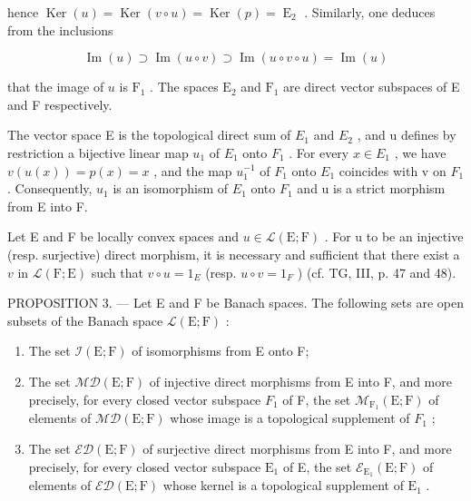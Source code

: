 hence \(\operatorname{Ker}(u) = \operatorname{Ker}(v \circ u) = \operatorname{Ker}(p) = \operatorname{E}_{2}\) . Similarly, one deduces from the inclusions

\[
\operatorname{Im} (u) \supset \operatorname{Im} (u \circ v) \supset \operatorname{Im} (u \circ v \circ u) = \operatorname{Im} (u)
\]

that the image of \(u\) is \(\mathrm{F}_{1}\) . The spaces \(\mathrm{E}_{2}\) and \(\mathrm{F}_{1}\) are direct vector subspaces of E and F respectively.

The vector space E is the topological direct sum of \(E_{1}\) and \(E_{2}\) , and u defines by restriction a bijective linear map \(u_{1}\) of \(E_{1}\) onto \(F_{1}\) . For every \(x \in E_{1}\) , we have \(v(u(x)) = p(x) = x\) , and the map \(u_{1}^{-1}\) of \(F_{1}\) onto \(E_{1}\) coincides with v on \(F_{1}\) . Consequently, \(u_{1}\) is an isomorphism of \(E_{1}\) onto \(F_{1}\) and u is a strict morphism from E into F.

Let E and F be locally convex spaces and \(u \in \mathcal{L}(\mathrm{E};\mathrm{F})\) . For u to be an injective (resp. surjective) direct morphism, it is necessary and sufficient that there exist a \(v\) in \(\mathcal{L}(\mathrm{F};\mathrm{E})\) such that \(v \circ u = 1_{E}\) (resp. \(u \circ v = 1_{F}\) ) (cf. TG, III, p. 47 and 48).

PROPOSITION 3. --- Let E and F be Banach spaces. The following sets are open subsets of the Banach space \(\mathcal{L}(\mathrm{E};\mathrm{F})\) :

\begin{enumerate}
\def\labelenumi{\alph{enumi})}
\item
  The set \(\mathcal{I}(\mathrm{E};\mathrm{F})\) of isomorphisms from E onto F;
\item
   The set \(\mathcal{M}\mathcal{D}(\mathrm{E};\mathrm{F})\) of injective direct morphisms from E into F, and more precisely, for every closed vector subspace \(F_{1}\) of F, the set \(\mathcal{M}_{\mathrm{F}_{1}}(\mathrm{E};\mathrm{F})\) of elements of \(\mathcal{M}\mathcal{D}(\mathrm{E};\mathrm{F})\) whose image is a topological supplement of \(F_{1}\) ;
\item
   The set \(\mathcal{E}\mathcal{D}(\mathrm{E};\mathrm{F})\) of surjective direct morphisms from E into F, and more precisely, for every closed vector subspace \(\mathrm{E}_1\) of E, the set \(\mathcal{E}_{\mathrm{E}_1}(\mathrm{E};\mathrm{F})\) of elements of \(\mathcal{E}\mathcal{D}(\mathrm{E};\mathrm{F})\) whose kernel is a topological supplement of \(\mathrm{E}_1\) .
\end{enumerate}

